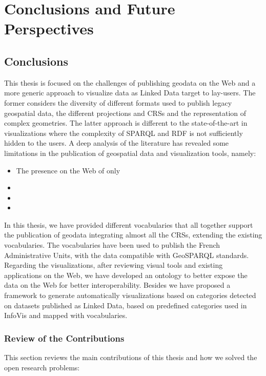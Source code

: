 \chapter{Conclusions and Future Perspectives}
\label{ch:conc}

\section{Conclusions}
\label{sec:final}

This thesis is focused on the challenges of publishing geodata on the Web and a more generic approach to visualize data as Linked Data target to lay-users. The former considers the diversity of different formats used to publish legacy geospatial data, the different projections and CRSs and the representation of complex geometries. The latter approach is different to the state-of-the-art in visualizations where the complexity of SPARQL and RDF is not sufficiently hidden to the users. A deep analysis of the literature has revealed some limitations in the publication of geospatial data and visualization tools, namely:
\begin{itemize}
\item The presence on the Web of only 
\item 
\item 
\item 
\end{itemize}

In this thesis, we have provided different vocabularies that all together support the publication of geodata integrating almost all the CRSs, extending the existing vocabularies. The vocabularies have been used to publish the French Administrative Units, with the data compatible with GeoSPARQL standards. Regarding the visualizations, after reviewing visual tools and existing applications on the Web, we have developed an ontology to better expose the data on the Web for better interoperability. Besides we have proposed a framework to generate automatically visualizations based on categories detected on datasets published as Linked Data, based on predefined categories used in InfoVis and mapped with vocabularies. 

\subsection{Review of the Contributions}
This section reviews the main contributions of this thesis and how we solved the open research problems:

